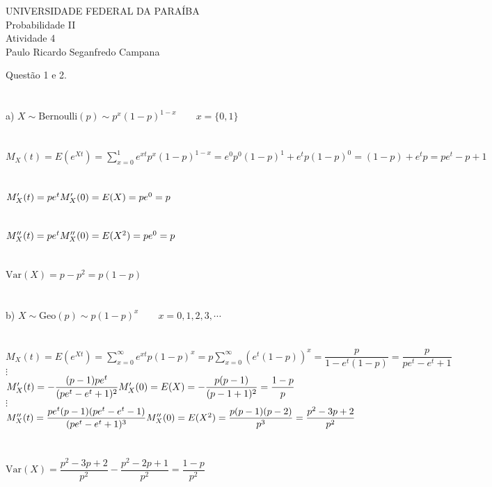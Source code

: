 \documentclass[12pt]{article}
\begin{document}
\begin{center}
	UNIVERSIDADE FEDERAL DA PARAÍBA\\
	Probabilidade II\\
	Atividade 4\\
	Paulo Ricardo Seganfredo Campana
\end{center}

\indent Questão 1 e 2.\\\\\\
\indent a) $X \sim \text{Bernoulli}(p) \sim p^{x} (1-p)^{1-x} \qquad x = \lbrace 0,1 \rbrace$\\\\\\
$M_{X}(t) = E(e^{Xt}) = \displaystyle \sum_{x=0}^{1} e^{xt} p^{x} (1-p)^{1-x} = e^{0} p^{0} (1-p)^{1} + e^{t} p (1-p)^{0} = (1-p) + e^{t} p = pe^t-p+1$\\\\\\
$M_{X}'(t) = pe^{t} \hfill M'_{X}(0) = E(X) = pe^{0} = p$\\\\\\
$M_{X}''(t) = pe^{t} \hfill M''_{X}(0) = E(X^{2})= pe^{0} = p$\\\\\\
$\text{Var}(X) = p-p^{2} = p(1-p)$\\\\\\

\indent b) $X \sim \text{Geo}(p) \sim p(1-p)^{x} \qquad x = 0,1,2,3,\cdots$\\\\\\
$M_{X}(t) = E(e^{Xt}) = \displaystyle \sum_{x=0}^{\infty} e^{xt} p(1-p)^{x} = p \sum_{x=0}^{\infty} (e^{t}(1-p))^{x} = \dfrac{p}{1 -e^{t}(1-p)} = \dfrac{p}{pe^{t} -e^{t} +1}$\\
$\vdots$\\
$M_{X}'(t) = -\dfrac{(p-1)pe^{t}}{(pe^{t}-e^{t}+1)^{2}} \hfill M_{X}'(0) = E(X) = -\dfrac{p(p-1)}{(p-1+1)^{2}} = \dfrac{1-p}{p}$\\
$\vdots$\\
$M_{X}''(t) = \dfrac{pe^{t} (p-1) (pe^{t}-e^{t}-1)}{(pe^{t}-e^{t}+1)^{3}} \hfill M_{X}''(0) = E(X^{2}) = \dfrac{p(p-1)(p-2)}{p^{3}} = \dfrac{p^{2}-3p+2}{p^{2}}$\\\\\\
$\text{Var}(X) = \dfrac{p^{2}-3p+2}{p^{2}} - \dfrac{p^{2}-2p+1}{p^{2}} = \dfrac{1-p}{p^{2}}$\\\\\\
\end{document}
